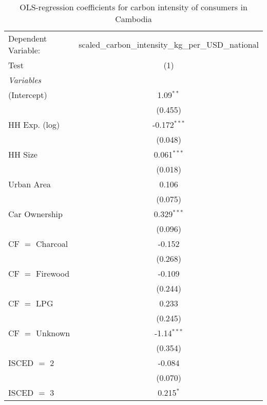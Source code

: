 
\begin{table}[htbp!]
   \centering
   \small
   \begin{adjustbox}{width = 1\textwidth, max height = 0.95\textheight, center}
      \begin{threeparttable}[b]
         \caption{\label{tab:OLS_1_KHM} OLS-regression coefficients for carbon intensity of consumers in Cambodia}
         \begin{tabular}{lc}
            \tabularnewline \midrule \midrule
            Dependent Variable: & scaled\_carbon\_intensity\_kg\_per\_USD\_national\\        
            Test                & (1)\\  
            \midrule
            \emph{Variables}\\
            (Intercept)         & 1.09$^{**}$\\   
                                & (0.455)\\   
            HH Exp. (log)       & -0.172$^{***}$\\   
                                & (0.048)\\   
            HH Size             & 0.061$^{***}$\\   
                                & (0.018)\\   
            Urban Area          & 0.106\\   
                                & (0.075)\\   
            Car Ownership       & 0.329$^{***}$\\   
                                & (0.096)\\   
            CF $=$ Charcoal     & -0.152\\   
                                & (0.268)\\   
            CF $=$ Firewood     & -0.109\\   
                                & (0.244)\\   
            CF $=$ LPG          & 0.233\\   
                                & (0.245)\\   
            CF $=$ Unknown      & -1.14$^{***}$\\   
                                & (0.354)\\   
            ISCED $=$ 2         & -0.084\\   
                                & (0.070)\\   
            ISCED $=$ 3         & 0.215$^{*}$\\   

\end{tabular}
\end{threeparttable}
\end{adjustbox}
\end{table}
